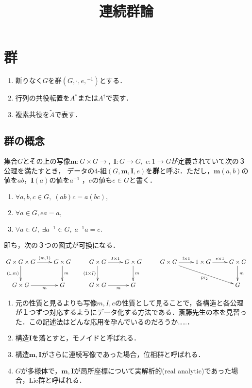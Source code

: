 \documentclass[uplatex,dvipdfmx]{jsreport}
\title{連続群論}
\author{}
\begin{document}
\chapter{群}

\begin{notation*}\mbox{}
    \begin{enumerate}
        \item 断りなく$G$を群$(G,\cdot,e,{}^{-1})$とする．
        \item 行列の共役転置を$A^*$または$A^\dagger$で表す．
        \item 複素共役を$\tilde{A}$で表す．
    \end{enumerate}
\end{notation*}

\section{群の概念}

\begin{definition}[group]
    集合$G$とその上の写像$\mathbf{m}:G\times G\to,\; \mathbf{I}:G\to G,\;e:1\to G$が定義されていて次の３公理を満たすとき，
    データの4-組$(G,\mathbf{m},\mathbf{I},e)$を\textbf{群}と呼ぶ．ただし，$\mathbf{m}(a,b)$の値を$ab$，$\mathbf{I}(a)$の値を$a^{-1}$
    ，$e$の値も$e\in G$と書く．
    \begin{enumerate}
        \item $\forall a,b,c\in G,\; (ab)c=a(bc)$,
        \item $\forall a\in G, ea=a$,
        \item $\forall a\in G,\;\exists a^{-1}\in G,\; a^{-1}a=e$.
    \end{enumerate}
    即ち，次の３つの図式が可換になる．
    \[\xymatrix{
        G\times G\times G\ar[r]^-{(m,1)}\ar[d]_-{(1,m)}&G\times G\ar[d]^-m&G\times G\ar[r]^-{I\times 1}\ar[d]_-{(1\times I)}&G\times G\ar[d]^-m&G\times G\ar[r]^-{!\times 1}\ar[drr]_-{\pr_2}&1\times G\ar[r]^-{e\times 1}&G\times G\ar[d]^-m\\
        G\times G\ar[r]_-m&G&G\times G\ar[r]_-m&G&&&G
    }
    \]
\end{definition}
\begin{remark}\mbox{}
    \begin{enumerate}
        \item 元の性質と見るよりも写像$m,I,e$の性質として見ることで，各構造と各公理が１つずつ対応するようにデータ化する方法である．斎藤先生の本を見習った．この記述法はどんな応用を孕んでいるのだろうか……．
        \item 構造$\mathbf{I}$を落とすと，モノイドと呼ばれる．
        \item 構造$\mathbf{m,I}$がさらに連続写像であった場合，位相群と呼ばれる．
        \item $G$が多様体で，$\mathbf{m,I}$が局所座標について実解析的(real analytic)であった場合，Lie群と呼ばれる．
    \end{enumerate}
\end{remark}
\end{document}
